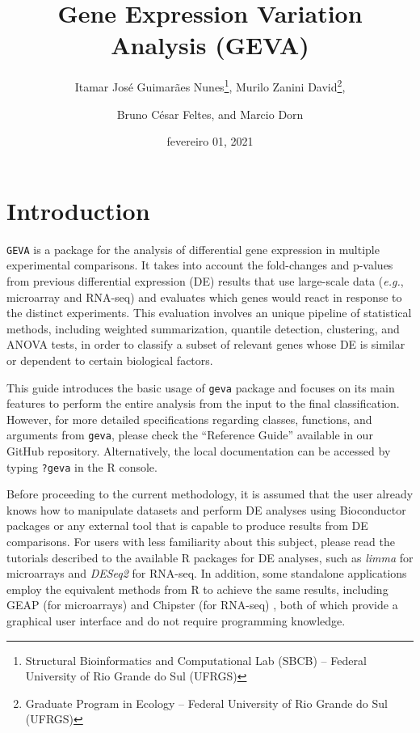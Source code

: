 \documentclass[
  12pt,
]{article}
\title{Gene Expression Variation Analysis (GEVA)}
\author{Itamar José Guimarães Nunes\footnote{Structural Bioinformatics and
  Computational Lab (SBCB) -- Federal University of Rio Grande do Sul
  (UFRGS)}, Murilo Zanini David\footnote{Graduate Program in Ecology --
  Federal University of Rio Grande do Sul (UFRGS)}, \linebreak \and Bruno César Feltes\footnotemark[1], and Marcio Dorn\footnotemark[1]}
\date{fevereiro 01, 2021}
\begin{document}
\maketitle

{
\setcounter{tocdepth}{2}
\tableofcontents
}

\hypertarget{introduction}{%
\section{Introduction}\label{introduction}}

\texttt{GEVA} is a package for the analysis of differential gene
expression in multiple experimental comparisons. It takes into account
the fold-changes and p-values from previous differential expression (DE)
results that use large-scale data (\emph{e.g.}, microarray and RNA-seq)
and evaluates which genes would react in response to the distinct
experiments. This evaluation involves an unique pipeline of statistical
methods, including weighted summarization, quantile detection,
clustering, and ANOVA tests, in order to classify a subset of relevant
genes whose DE is similar or dependent to certain biological factors.

This guide introduces the basic usage of \texttt{geva} package and
focuses on its main features to perform the entire analysis from the
input to the final classification. However, for more detailed
specifications regarding classes, functions, and arguments from
\texttt{geva}, please check the ``Reference Guide'' available in our
GitHub repository. Alternatively, the local documentation can be
accessed by typing \texttt{?geva} in the R console.

Before proceeding to the current methodology, it is assumed that the
user already knows how to manipulate datasets and perform DE analyses
using Bioconductor packages or any external tool that is capable to
produce results from DE comparisons. For users with less familiarity
about this subject, please read the tutorials described to the available
R packages for DE analyses, such as \emph{limma} \cite{smyth2005limma}
for microarrays and \emph{DESeq2} \cite{love2014moderated} for RNA-seq.
In addition, some standalone applications employ the equivalent methods
from R to achieve the same results, including GEAP (for microarrays)
\cite{nunes2018gene} and Chipster (for RNA-seq)
\cite{kallio2011chipster}, both of which provide a graphical user
interface and do not require programming knowledge.
\end{document}
